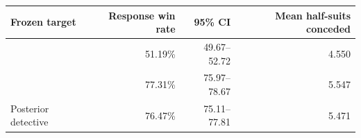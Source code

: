 \begin{tabular}{lrrr}
\toprule
Frozen target & Response win rate & 95\% CI & Mean half-suits conceded \\
\midrule
\vfast{} & 51.19\% & 49.67--52.72 & 4.550 \\
\vthree{} & 77.31\% & 75.97--78.67 & 5.547 \\
Posterior detective & 76.47\% & 75.11--77.81 & 5.471 \\
\bottomrule
\end{tabular}